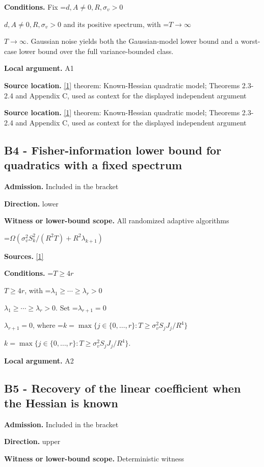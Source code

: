 \documentclass[10pt,a4paper]{article}
\newcommand{\AtlasMath}[1]{\par\begingroup\centering\setbox0=\hbox{$\displaystyle #1$}\ifdim\wd0>1.4\linewidth\typeout{ATLAS WIDE FORMULA: \the\wd0}\fi\ifdim\wd0>\linewidth\resizebox{\linewidth}{!}{\box0}\else\box0\fi\par\endgroup}
\newcommand{\AtlasInlineMath}[1]{\begingroup\setbox0=\hbox{$#1$}\ifdim\wd0>.4\linewidth\endgroup\AtlasMath{#1}\else\endgroup$#1$\fi}
\begin{document}
\textbf{Conditions.} Fix \AtlasInlineMath{d,A\ne0,R,\sigma_v>0} and its positive spectrum, with \AtlasInlineMath{T\to\infty}. Gaussian noise yields both the Gaussian-model lower bound and a worst-case lower bound over the full variance-bounded class.

\textbf{Local argument.} A1

\textbf{Source location.} \href{https://proceedings.neurips.cc/paper_files/paper/2023/file/6e60a9023d2c63f7f0856910129ae753-Paper-Conference.pdf}{[1]} theorem: Known-Hessian quadratic model; Theorems 2.3-2.4 and Appendix C, used as context for the displayed independent argument

\textbf{Source location.} \href{https://proceedings.neurips.cc/paper_files/paper/2023/file/6e60a9023d2c63f7f0856910129ae753-Paper-Conference.pdf}{[1]} theorem: Known-Hessian quadratic model; Theorems 2.3-2.4 and Appendix C, used as context for the displayed independent argument

\subsection{B4 - Fisher-information lower bound for quadratics with a fixed spectrum}
\textbf{Admission.} Included in the bracket

\textbf{Direction.} lower

\textbf{Witness or lower-bound scope.} All randomized adaptive algorithms

\AtlasMath{\Omega(\sigma_v^2 S_k^2/(R^2T)+R^2\lambda_{k+1})}
\textbf{Sources.} \href{https://proceedings.neurips.cc/paper_files/paper/2023/file/6e60a9023d2c63f7f0856910129ae753-Paper-Conference.pdf}{[1]}

\textbf{Conditions.} \AtlasInlineMath{T\ge4r}, with \AtlasInlineMath{\lambda_1\ge\cdots\ge\lambda_r>0}. Set \AtlasInlineMath{\lambda_{r+1}=0}, where \AtlasInlineMath{k=\max\{j\in\{0,\ldots,r\}:T\ge\sigma_v^2S_jJ_j/R^4\}}.

\textbf{Local argument.} A2

\subsection{B5 - Recovery of the linear coefficient when the Hessian is known}
\textbf{Admission.} Included in the bracket

\textbf{Direction.} upper

\textbf{Witness or lower-bound scope.} Deterministic witness
\end{document}
